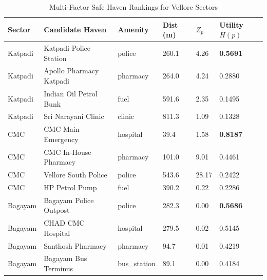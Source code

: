 \documentclass[conference]{IEEEtran}
\begin{document}
\begin{table}[b]
\centering
\caption{Multi-Factor Safe Haven Rankings for Vellore Sectors}
\label{tab:safe_havens}
\begin{tabular}{llllll}
\toprule
\textbf{Sector} & \textbf{Candidate Haven} & \textbf{Amenity} & \textbf{Dist (m)} & \textbf{$Z_p$} & \textbf{Utility $H(p)$} \\
\midrule
Katpadi & Katpadi Police Station & police & 260.1 & 4.26 & \textbf{0.5691} \\
Katpadi & Apollo Pharmacy Katpadi & pharmacy & 264.0 & 4.24 & 0.2880 \\
Katpadi & Indian Oil Petrol Bunk & fuel & 591.6 & 2.35 & 0.1495 \\
Katpadi & Sri Narayani Clinic & clinic & 811.3 & 1.09 & 0.1328 \\
CMC & CMC Main Emergency & hospital & 39.4 & 1.58 & \textbf{0.8187} \\
CMC & CMC In-House Pharmacy & pharmacy & 101.0 & 9.01 & 0.4461 \\
CMC & Vellore South Police & police & 543.6 & 28.17 & 0.2422 \\
CMC & HP Petrol Pump & fuel & 390.2 & 0.22 & 0.2286 \\
Bagayam & Bagayam Police Outpost & police & 282.3 & 0.00 & \textbf{0.5686} \\
Bagayam & CHAD CMC Hospital & hospital & 279.5 & 0.02 & 0.5145 \\
Bagayam & Santhosh Pharmacy & pharmacy & 94.7 & 0.01 & 0.4219 \\
Bagayam & Bagayam Bus Terminus & bus\_station & 89.1 & 0.00 & 0.4184 \\
\bottomrule
\end{tabular}
\end{table}
\end{document}
